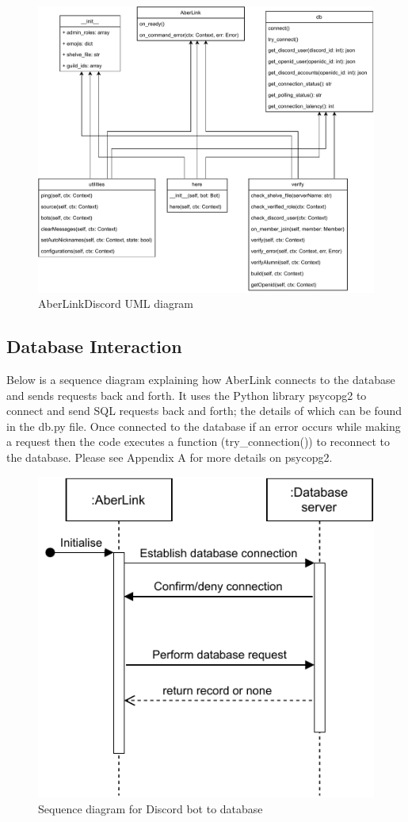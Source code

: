\begin{figure}[H]
	\centering
	\includegraphics[width=1\linewidth]{Figures/discord-uml}
	\caption{AberLinkDiscord UML diagram}
	\label{fig:discord-uml}
\end{figure}

\subsection{Database Interaction}
Below is a sequence diagram explaining how AberLink connects to the database and sends requests back and forth. It uses the Python library psycopg2 \cite{psycopg2} to connect and send SQL requests back and forth; the details of which can be found in the db.py file. Once connected to the database if an error occurs while making a request then the code executes a function (try\_connection()) to reconnect to the database. Please see Appendix A for more details on psycopg2.
\begin{figure}[H]
	\centering
	\includegraphics[width=0.5\linewidth]{Figures/aberlink-sequence}
	\caption{Sequence diagram for Discord bot to database}
	\label{fig:architecture-dis-seq}
\end{figure}

